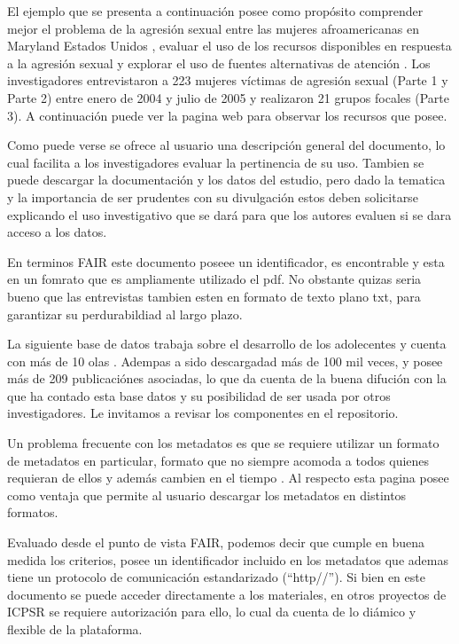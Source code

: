 \documentclass[
  14pt,
]{book}
\begin{document}
El ejemplo que se presenta a continuación posee como propósito comprender mejor el problema de la agresión sexual entre las mujeres afroamericanas en Maryland Estados Unidos , evaluar el uso de los recursos disponibles en respuesta a la agresión sexual y explorar el uso de fuentes alternativas de atención \citep{weist_African_2009}. Los investigadores entrevistaron a 223 mujeres víctimas de agresión sexual (Parte 1 y Parte 2) entre enero de 2004 y julio de 2005 y realizaron 21 grupos focales (Parte 3). A continuación puede ver la pagina web para observar los recursos que posee.

Como puede verse se ofrece al usuario una descripción general del documento, lo cual facilita a los investigadores evaluar la pertinencia de su uso. Tambien se puede descargar la documentación y los datos del estudio, pero dado la tematica y la importancia de ser prudentes con su divulgación estos deben solicitarse explicando el uso investigativo que se dará para que los autores evaluen si se dara acceso a los datos.

En terminos FAIR este documento poseee un identificador, es encontrable y esta en un fomrato que es ampliamente utilizado el pdf. No obstante quizas seria bueno que las entrevistas tambien esten en formato de texto plano txt, para garantizar su perdurabildiad al largo plazo.

La siguiente base de datos trabaja sobre el desarrollo de los adolecentes y cuenta con más de 10 olas \citep{mortimer_Youth_2009}. Adempas a sido descargadad más de 100 mil veces, y posee más de 209 publicaciónes asociadas, lo que da cuenta de la buena difución con la que ha contado esta base datos y su posibilidad de ser usada por otros investigadores. Le invitamos a revisar los componentes en el repositorio.

Un problema frecuente con los metadatos es que se requiere utilizar un formato de metadatos en particular, formato que no siempre acomoda a todos quienes requieran de ellos y además cambien en el tiempo \citep{gomez_Datos_2016}. Al respecto esta pagina posee como ventaja que permite al usuario descargar los metadatos en distintos formatos.

Evaluado desde el punto de vista FAIR, podemos decir que cumple en buena medida los criterios, posee un identificador incluido en los metadatos que ademas tiene un protocolo de comunicación estandarizado (``http//''). Si bien en este documento se puede acceder directamente a los materiales, en otros proyectos de ICPSR se requiere autorización para ello, lo cual da cuenta de lo diámico y flexible de la plataforma.
\end{document}
